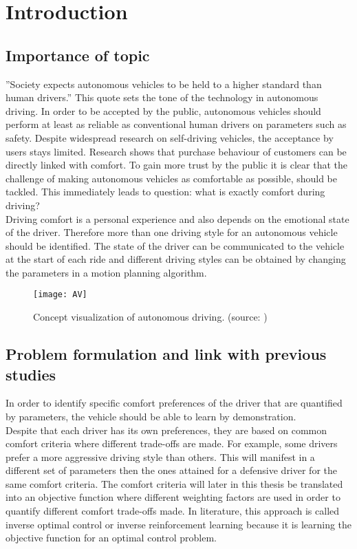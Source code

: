 \chapter{Introduction}
\label{cha:intro}
\section{Importance of topic} \label{s:importance_topic}
''Society expects autonomous vehicles to be held to a higher standard than human drivers.'' \cite{Prof.Amnon} This quote sets the tone of the technology in autonomous driving. In order to be accepted by the public, autonomous vehicles should perform at least as reliable as conventional human drivers on parameters such as safety. Despite widespread research on self-driving vehicles, the acceptance by users stays limited.\cite{Bae2019} Research shows that purchase behaviour of customers can be directly linked with comfort. To gain more trust by the public it is clear that the challenge of making autonomous vehicles as comfortable as possible, should be tackled. This immediately leads to question: what is exactly comfort during driving?\\
Driving comfort is a personal experience and also depends on the emotional state of the driver. Therefore more than one driving style for an autonomous vehicle should be identified. \cite{Eindhoven2019} The state of the driver can be communicated to the vehicle at the start of each ride and different driving styles can be obtained by changing the parameters in a motion planning algorithm. 

\begin{figure}[h!]
	\centering
	\texttt{[image: AV]}
	\caption{Concept visualization of autonomous driving. (source: \cite{AV})}
	\label{fig:AV}
\end{figure} 
\newpage

\section{Problem formulation and link with previous studies}
In order to identify specific comfort preferences of the driver that are quantified by parameters, the vehicle should be able to learn by demonstration. \cite{Kuderer2015a}\\
Despite that each driver has its own preferences, they are based on common comfort criteria where different trade-offs are made. For example, some drivers prefer a more aggressive driving style than others. This will manifest in a different set of parameters then the ones attained for a defensive driver for the same comfort criteria. The comfort criteria will later in this thesis be translated into an objective function where different weighting factors are used in order to quantify different comfort trade-offs made. In literature, this approach is called inverse optimal control or inverse reinforcement learning because it is learning the objective function for an optimal control problem.\\

